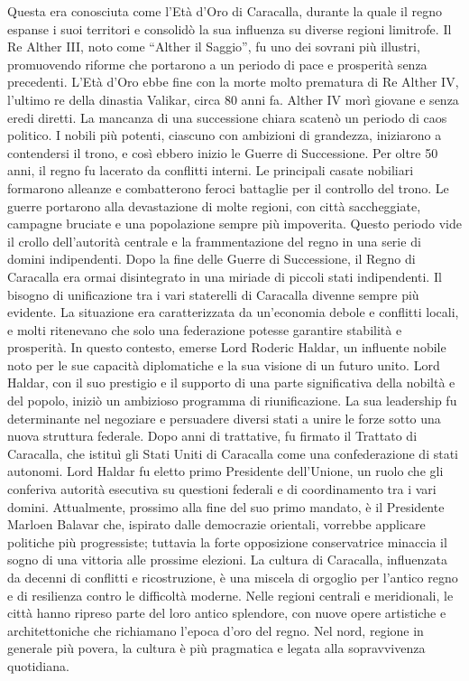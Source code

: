 \documentclass[10pt, a4paper]{report}
\begin{document}
\begin{multicols}{2}
Questa era conosciuta come l'Età d'Oro di Caracalla, durante la quale il regno espanse i suoi territori e consolidò la sua influenza su diverse regioni limitrofe. Il Re Alther III, noto come “Alther il Saggio”, fu uno dei sovrani più illustri, promuovendo riforme che portarono a un periodo di pace e prosperità senza precedenti.
L'Età d'Oro ebbe fine con la morte molto prematura di Re Alther IV, l'ultimo re della dinastia Valikar, circa 80 anni fa. Alther IV morì giovane e senza eredi diretti. La mancanza di una successione chiara scatenò un periodo di caos politico. I nobili più potenti, ciascuno con ambizioni di grandezza, iniziarono a contendersi il trono, e così ebbero inizio le Guerre di Successione.
Per oltre 50 anni, il regno fu lacerato da conflitti interni. Le principali casate nobiliari formarono alleanze e combatterono feroci battaglie per il controllo del trono. Le guerre portarono alla devastazione di molte regioni, con città saccheggiate, campagne bruciate e una popolazione sempre più impoverita. Questo periodo vide il crollo dell’autorità centrale e la frammentazione del regno in una serie di domini indipendenti.
Dopo la fine delle Guerre di Successione, il Regno di Caracalla era ormai disintegrato in una miriade di piccoli stati indipendenti.
Il bisogno di unificazione tra i vari staterelli di Caracalla divenne sempre più evidente. La situazione era caratterizzata da un'economia debole e conflitti locali, e molti ritenevano che solo una federazione potesse garantire stabilità e prosperità.
In questo contesto, emerse Lord Roderic Haldar, un influente nobile noto per le sue capacità diplomatiche e la sua visione di un futuro unito. Lord Haldar, con il suo prestigio e il supporto di una parte significativa della nobiltà e del popolo, iniziò un ambizioso programma di riunificazione. La sua leadership fu determinante nel negoziare e persuadere diversi stati a unire le forze sotto una nuova struttura federale. Dopo anni di trattative, fu firmato il Trattato di Caracalla, che istituì gli Stati Uniti di Caracalla come una confederazione di stati autonomi. Lord Haldar fu eletto primo Presidente dell'Unione, un ruolo che gli conferiva autorità esecutiva su questioni federali e di coordinamento tra i vari domini.
Attualmente, prossimo alla fine del suo primo mandato, è il Presidente Marloen Balavar che, ispirato dalle democrazie orientali, vorrebbe applicare politiche più progressiste; tuttavia la forte opposizione conservatrice minaccia il sogno di una vittoria alle prossime elezioni.
La cultura di Caracalla, influenzata da decenni di conflitti e ricostruzione, è una miscela di orgoglio per l’antico regno e di resilienza contro le difficoltà moderne. Nelle regioni centrali e meridionali, le città hanno ripreso parte del loro antico splendore, con nuove opere artistiche e architettoniche che richiamano l'epoca d'oro del regno. Nel nord, regione in generale più povera, la cultura è più pragmatica e legata alla sopravvivenza quotidiana.

\end{multicols}
\end{document}
